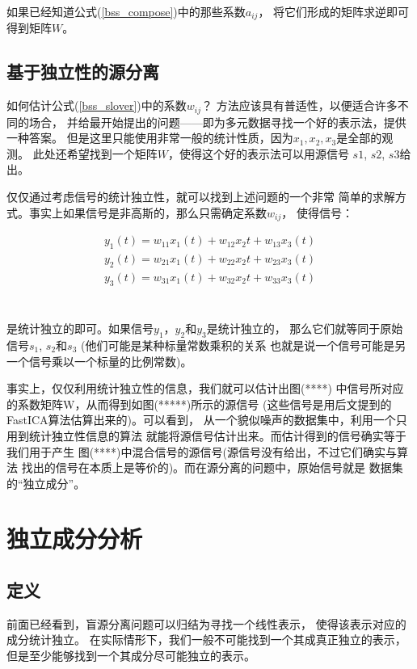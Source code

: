 如果已经知道公式(\ref{bss_compose})中的那些系数$a_{ij}$，
将它们形成的矩阵求逆即可得到矩阵$W$。
    
\subsection{基于独立性的源分离}
如何估计公式(\ref{bss_slover})中的系数$w_{ij}$？
方法应该具有普适性，以便适合许多不同的场合，
并给最开始提出的问题——即为多元数据寻找一个好的表示法，提供一种答案。
但是这里只能使用非常一般的统计性质，因为$x_1, x_2, x_3$是全部的观测。
此处还希望找到一个矩阵$W$，使得这个好的表示法可以用源信号
$s1$, $s2$, $s3$给出。
    
仅仅通过考虑信号的统计独立性，就可以找到上述问题的一个非常
简单的求解方式。事实上如果信号是非高斯的，那么只需确定系数$w_{ij}$，
使得信号：\\
\parbox{10cm}{
\begin{eqnarray*}
y_1(t)=w_{11}x_1(t)+w_{12}x_2{t}+w_{13}x_3(t) \\
y_2(t)=w_{21}x_1(t)+w_{22}x_2{t}+w_{23}x_3(t) \\
y_3(t)=w_{31}x_1(t)+w_{32}x_2{t}+w_{33}x_3(t) \\
\end{eqnarray*}
}\hfill
\parbox{3cm}{\begin{eqnarray}\label{bss_slover} \end{eqnarray}}

是统计独立的即可。如果信号$y_1$，$y_2$和$y_3$是统计独立的，
那么它们就等同于原始信号$s_1$, $s_2$和$s_3$
(他们可能是某种标量常数乘积的关系
也就是说一个信号可能是另一个信号乘以一个标量的比例常数)。

事实上，仅仅利用统计独立性的信息，我们就可以估计出图(****)
中信号所对应的系数矩阵W，从而得到如图(*****)所示的源信号
(这些信号是用后文提到的FastICA算法估算出来的)。可以看到，
从一个貌似噪声的数据集中，利用一个只用到统计独立性信息的算法
就能将源信号估计出来。而估计得到的信号确实等于我们用于产生
图(****)中混合信号的源信号(源信号没有给出，不过它们确实与算法
找出的信号在本质上是等价的)。而在源分离的问题中，原始信号就是
数据集的“独立成分”。


\section{独立成分分析}
\subsection{定义}
前面已经看到，盲源分离问题可以归结为寻找一个线性表示，
使得该表示对应的成分统计独立。
在实际情形下，我们一般不可能找到一个其成真正独立的表示，
但是至少能够找到一个其成分尽可能独立的表示。

